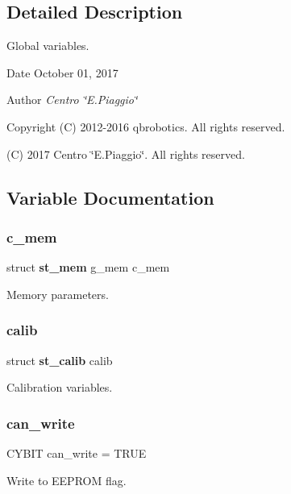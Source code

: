 \subsection{Detailed Description}
Global variables. 

\begin{DoxyDate}{Date}
October 01, 2017 
\end{DoxyDate}
\begin{DoxyAuthor}{Author}
{\itshape Centro \char`\"{}\+E.\+Piaggio\char`\"{}} 
\end{DoxyAuthor}
\begin{DoxyCopyright}{Copyright}
(C) 2012-\/2016 qbrobotics. All rights reserved. 

(C) 2017 Centro \char`\"{}\+E.\+Piaggio\char`\"{}. All rights reserved. 
\end{DoxyCopyright}


\subsection{Variable Documentation}
\mbox{\label{globals_8c_a44c3cbd8e234e0816f0334e29646a800}} 
\subsubsection{c\+\_\+mem}
{\footnotesize\ttfamily struct \textbf{ st\+\_\+mem} g\+\_\+mem c\+\_\+mem}

Memory parameters. \mbox{\label{globals_8c_aed96fdd8308fe2c4fc07c3b5db1c7bbb}} 
\subsubsection{calib}
{\footnotesize\ttfamily struct \textbf{ st\+\_\+calib} calib}

Calibration variables. \mbox{\label{globals_8c_acd57396ca1b2a02a76877acecd29ddb0}} 
\subsubsection{can\+\_\+write}
{\footnotesize\ttfamily C\+Y\+B\+IT can\+\_\+write = T\+R\+UE}

Write to E\+E\+P\+R\+OM flag. \mbox{\label{globals_8c_a910e6d34a0bb2e8dbaf576e06bdf56f5}} 
